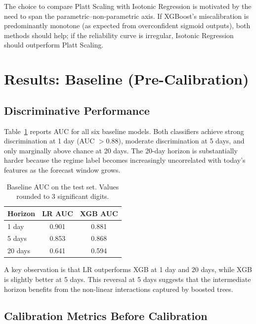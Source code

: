 \documentclass[12pt]{article}
\begin{document}
The choice to compare Platt Scaling with Isotonic Regression is motivated by
the need to span the parametric--non-parametric axis.
If XGBoost's miscalibration is predominantly monotone (as expected from
overconfident sigmoid outputs), both methods should help; if the reliability
curve is irregular, Isotonic Regression should outperform Platt Scaling.

\section{Results: Baseline (Pre-Calibration)}

\subsection{Discriminative Performance}

Table~\ref{tab:baseline-auc} reports AUC for all six baseline models.
Both classifiers achieve strong discrimination at 1 day (AUC $> 0.88$),
moderate discrimination at 5 days, and only marginally above chance at
20 days.
The 20-day horizon is substantially harder because the regime label becomes
increasingly uncorrelated with today's features as the forecast window grows.

\begin{table}[H]
\centering
\caption{Baseline AUC on the test set. Values rounded to 3 significant digits.}
\label{tab:baseline-auc}
\begin{tabular}{lcc}
\toprule
Horizon & LR AUC & XGB AUC \\
\midrule
1 day  & 0.901 & 0.881 \\
5 days & 0.853 & 0.868 \\
20 days & 0.641 & 0.594 \\
\bottomrule
\end{tabular}
\end{table}

A key observation is that LR outperforms XGB at 1 day and 20 days, while
XGB is slightly better at 5 days.
This reversal at 5 days suggests that the intermediate horizon benefits from
the non-linear interactions captured by boosted trees.

\subsection{Calibration Metrics Before Calibration}
\end{document}
